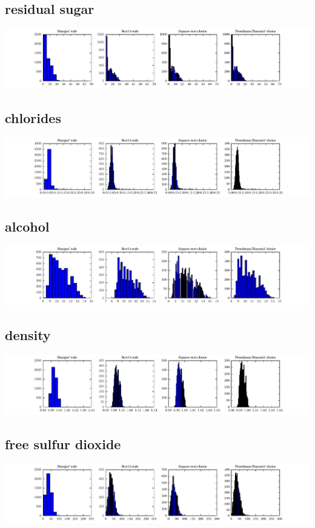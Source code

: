 \documentclass{report}
\begin{document}
\subsection{residual sugar}
\includegraphics{histograms/residual_sugar.pdf}

\subsection{chlorides}
\includegraphics{histograms/chlorides.pdf}

\subsection{alcohol}
\includegraphics{histograms/alcohol.pdf}

\subsection{density}
\includegraphics{histograms/density.pdf}

\subsection{free sulfur dioxide}
\includegraphics{histograms/free_sulfur_dioxide.pdf}
\end{document}
